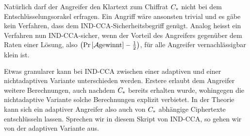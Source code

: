 Natürlich darf der Angreifer den Klartext zum Chiffrat $C_*$ nicht bei dem Entschlüsselungsorakel erfragen. Ein Angriff wäre ansonsten trivial und es gäbe kein Verfahren, dass dem IND-CCA-Sicherheitsbegriff genügt. Analog heisst ein Verfahren nun IND-CCA-sicher, wenn der Vorteil des Angreifers gegenüber dem Raten einer Lösung, also $ \left( \text{Pr} \left[ \mathcal{A} \text{gewinnt} \right] - \frac{1}{2} \right)$, für alle Angreifer vernachlässigbar klein ist.

Etwas granularer kann bei IND-CCA zwischen einer adaptiven und einer nichtadaptiven Variante unterschieden werden. Erstere erlaubt dem Angreifer weitere Berechnungen, auch nachdem $C_*$ bereits erhalten wurde, wohingegen die nichtadaptive Variante solche Berechnungen explizit verbietet. In der Theorie kann sich ein adaptiver Angreifer also auch von $C_*$ abhängige Ciphertexte entschlüsseln lassen. Sprechen wir in diesem Skript von IND-CCA, so gehen wir von der adaptiven Variante aus.
